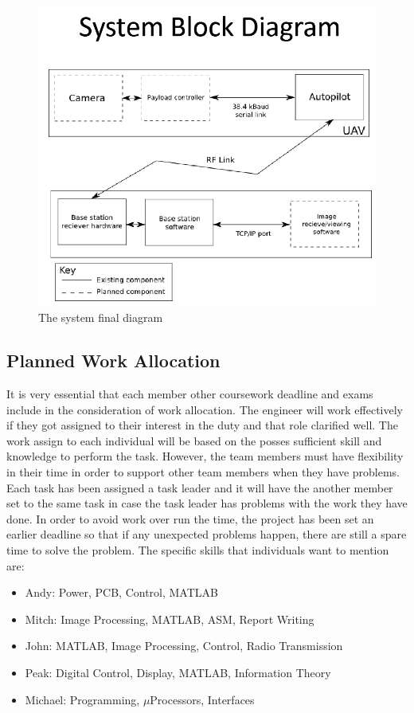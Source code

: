 \begin{figure}[!hbtp]
\begin{center}
\includegraphics[scale=0.6]{figures/SystemBlockDiagram.PNG} 
\caption{The system final diagram\label{systemBlocD}}
\end{center}
\end{figure}


\subsection{Planned Work Allocation}
 It is very essential that each member other coursework deadline and exams include in the consideration of work allocation. 
The engineer will work effectively if they got assigned  to their interest in the duty and that role clarified well. The work assign to each individual will be based on the posses sufficient skill and knowledge to perform the task. However, the team members must have flexibility in their time in order to support other team members when they have problems. Each task has been assigned a task leader and it will have the another member set to the same task in case the task leader has problems with the work they have done. In order to avoid work over run the time, the project has been set an earlier deadline so that if any unexpected problems happen, there are still a spare time to solve the problem. The specific skills that individuals want to mention are:

\begin{itemize}
\item Andy: Power, PCB, Control, MATLAB
\item Mitch: Image Processing, MATLAB, ASM, Report Writing
\item John: MATLAB, Image Processing, Control, Radio Transmission
\item Peak: Digital Control, Display, MATLAB, Information Theory
\item Michael: Programming, $\mu$Processors, Interfaces
\end{itemize}

